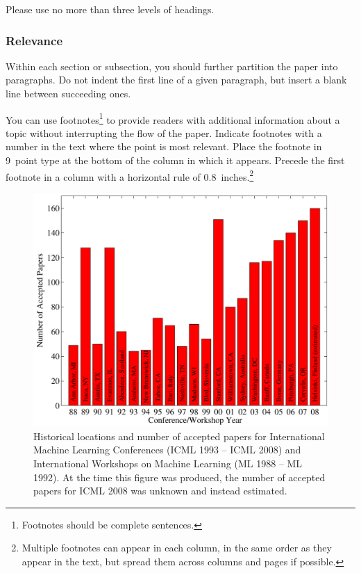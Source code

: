 \documentclass{article}
\theoremstyle{plain}
\theoremstyle{definition}
\theoremstyle{remark}
\begin{document}
Please use no more than three levels of headings.

\subsubsection{Relevance}

Within each section or subsection, you should further partition the
paper into paragraphs. Do not indent the first line of a given
paragraph, but insert a blank line between succeeding ones.

You can use footnotes\footnote{Footnotes
should be complete sentences.} to provide readers with additional
information about a topic without interrupting the flow of the paper.
Indicate footnotes with a number in the text where the point is most
relevant. Place the footnote in 9~point type at the bottom of the
column in which it appears. Precede the first footnote in a column
with a horizontal rule of 0.8~inches.\footnote{Multiple footnotes can
appear in each column, in the same order as they appear in the text,
but spread them across columns and pages if possible.}

\begin{figure}[ht]
\vskip 0.2in
\begin{center}
\centerline{\includegraphics[width=\columnwidth]{icml_numpapers}}
\caption{Historical locations and number of accepted papers for International
Machine Learning Conferences (ICML 1993 -- ICML 2008) and International
Workshops on Machine Learning (ML 1988 -- ML 1992). At the time this figure was
produced, the number of accepted papers for ICML 2008 was unknown and instead
estimated.}
\label{icml-historical}
\end{center}
\vskip -0.2in
\end{figure}
\end{document}
